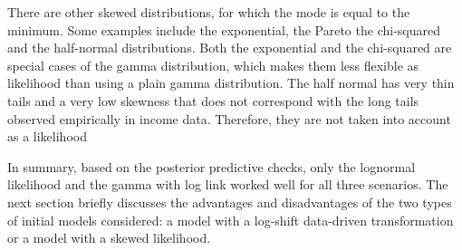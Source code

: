 There are other skewed distributions, for which the mode is equal to the minimum.
Some examples include the exponential, the Pareto the chi-squared and the half-normal distributions.
Both the exponential and the chi-squared are special cases of the gamma distribution, which makes them less flexible as likelihood than using a plain gamma distribution.
The half normal has very thin tails and a very low skewness that does not correspond with the long tails observed empirically in income data.
Therefore, they are not taken into account as a likelihood

In summary, based on the posterior predictive checks, only the lognormal likelihood and the gamma with log link worked well for all three scenarios. The next section briefly discusses the advantages and disadvantages of the two types of initial models considered: a model with a log-shift data-driven transformation or a model with a skewed likelihood.

